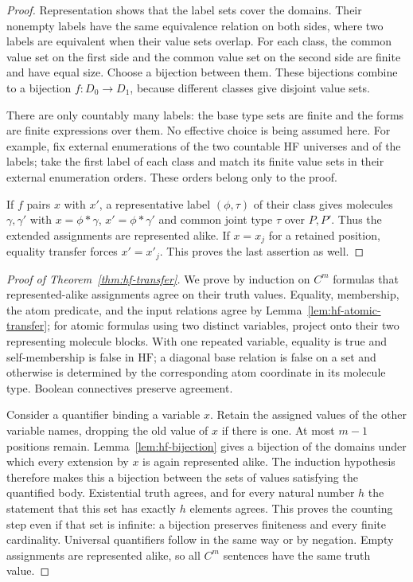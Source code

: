 \begin{proof}
Representation shows that the label sets cover the domains.  Their
nonempty labels have the same equivalence relation on both sides, where
two labels are equivalent when their value sets overlap.  For each
class, the common value set on the first side and the common value set on
the second side are finite and have equal size.  Choose a bijection
between them.  These bijections combine to a bijection $f:D_0\to D_1$,
because different classes give disjoint value sets.

There are only countably many labels: the base type sets are finite and
the forms are finite expressions over them.  No effective choice is
being assumed here.  For example, fix external enumerations of the two
countable HF universes and of the labels; take the first label of each
class and match its finite value sets in their external enumeration
orders.  These orders belong only to the proof.

If $f$ pairs $x$ with $x'$, a representative label $(\phi,\tau)$ of their
class gives molecules $\gamma,\gamma'$ with
$x=\phi*\gamma$, $x'=\phi*\gamma'$ and common joint type $\tau$ over
$P,P'$.  Thus the extended assignments are represented alike.  If
$x=x_j$ for a retained position, equality transfer forces $x'=x'_j$.
This proves the last assertion as well.
\end{proof}

\begin{proof}[Proof of Theorem~\ref{thm:hf-transfer}]
We prove by induction on $C^m$ formulas that represented-alike assignments
agree on their truth values.  Equality, membership, the atom predicate,
and the input relations agree by Lemma~\ref{lem:hf-atomic-transfer}; for
atomic formulas using two distinct variables, project onto their two
representing molecule blocks.  With one repeated variable, equality is
true and self-membership is false in $\mathrm{HF}$; a diagonal base
relation is false on a set and otherwise is determined by the corresponding
atom coordinate in its molecule type.  Boolean connectives preserve
agreement.

Consider a quantifier binding a variable $x$.  Retain the assigned values
of the other variable names, dropping the old value of $x$ if there is
one.  At most $m-1$ positions remain.  Lemma~\ref{lem:hf-bijection} gives
a bijection of the domains under which every extension by $x$ is again
represented alike.  The induction hypothesis therefore makes this a
bijection between the sets of values satisfying the quantified body.
Existential truth agrees, and for every natural number $h$ the statement
that this set has exactly $h$ elements agrees.  This proves the counting
step even if that set is infinite: a bijection preserves finiteness and
every finite cardinality.  Universal quantifiers follow in the same way
or by negation.  Empty assignments are represented alike, so all $C^m$
sentences have the same truth value.
\end{proof}

